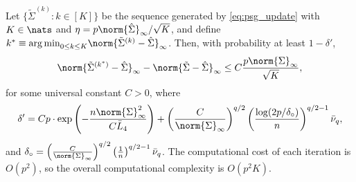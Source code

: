 \documentclass[aos]{imsart}
\begin{document}
\begin{theorem} \label{thm:psg_error}
    Let $\{\tilde\Sigma^{(k)} : k \in [K]\}$ be the sequence generated by \cref{eq:psg_update} with $K \in \nats$ and $\eta = p \norm{\hat\Sigma}_\infty/\sqrt{K}$, and define $k^* \equiv {\arg\min}_{0 \leq k \leq K} \norm{\tilde\Sigma^{(k)}-\hat\Sigma}_\infty$.
    Then, with probability at least $1 - \delta'$,
    \begin{equation*}
        \norm{\tilde\Sigma^{(k^*)} - \hat\Sigma}_\infty - \norm{\tilde\Sigma - \hat\Sigma}_\infty 
        \leq C \frac{p \norm{\Sigma}_\infty}{\sqrt{K}},
    \end{equation*}
    for some universal constant $C>0$, where
    \begin{equation*}
        \delta' = C p \cdot \exp\left( - \frac{n \norm{\Sigma}_\infty^2}{C \bar{L}_4} \right) 
        + \left( \frac{C}{\norm{\Sigma}_\infty} \right)^{q/2} \left( \frac{\log(2p/\delta_\circ)}{n} \right)^{q/2 - 1} \bar\nu_q,
    \end{equation*}
    and $\delta_\circ = \left( \frac{C}{\norm{\Sigma}_\infty} \right)^{q/2} \left( \frac{1}{n} \right)^{q/2 - 1} \bar\nu_q$.
    The computational cost of each iteration is $O(p^{2})$, so the overall computational complexity is $O(p^{2} K)$.
\end{theorem}
\end{document}
